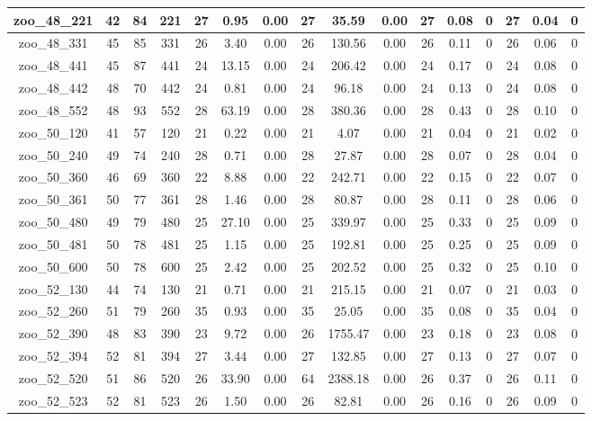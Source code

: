 \begin{landscape}
\begin{longtable}{|c|c|c|c|c|c|c|c|c|c|c|c|c|c|c|c|}
zoo\_48\_221 & 42 & 84 & 221 & 27 & 0.95 & 0.00 & 27 & 35.59 & 0.00 & 27 & 0.08 & 0 & 27 & 0.04 & 0 \\ \hline 
zoo\_48\_331 & 45 & 85 & 331 & 26 & 3.40 & 0.00 & 26 & 130.56 & 0.00 & 26 & 0.11 & 0 & 26 & 0.06 & 0 \\ \hline 
zoo\_48\_441 & 45 & 87 & 441 & 24 & 13.15 & 0.00 & 24 & 206.42 & 0.00 & 24 & 0.17 & 0 & 24 & 0.08 & 0 \\ \hline 
zoo\_48\_442 & 48 & 70 & 442 & 24 & 0.81 & 0.00 & 24 & 96.18 & 0.00 & 24 & 0.13 & 0 & 24 & 0.08 & 0 \\ \hline 
zoo\_48\_552 & 48 & 93 & 552 & 28 & 63.19 & 0.00 & 28 & 380.36 & 0.00 & 28 & 0.43 & 0 & 28 & 0.10 & 0 \\ \hline 
zoo\_50\_120 & 41 & 57 & 120 & 21 & 0.22 & 0.00 & 21 & 4.07 & 0.00 & 21 & 0.04 & 0 & 21 & 0.02 & 0 \\ \hline 
zoo\_50\_240 & 49 & 74 & 240 & 28 & 0.71 & 0.00 & 28 & 27.87 & 0.00 & 28 & 0.07 & 0 & 28 & 0.04 & 0 \\ \hline 
zoo\_50\_360 & 46 & 69 & 360 & 22 & 8.88 & 0.00 & 22 & 242.71 & 0.00 & 22 & 0.15 & 0 & 22 & 0.07 & 0 \\ \hline 
zoo\_50\_361 & 50 & 77 & 361 & 28 & 1.46 & 0.00 & 28 & 80.87 & 0.00 & 28 & 0.11 & 0 & 28 & 0.06 & 0 \\ \hline 
zoo\_50\_480 & 49 & 79 & 480 & 25 & 27.10 & 0.00 & 25 & 339.97 & 0.00 & 25 & 0.33 & 0 & 25 & 0.09 & 0 \\ \hline 
zoo\_50\_481 & 50 & 78 & 481 & 25 & 1.15 & 0.00 & 25 & 192.81 & 0.00 & 25 & 0.25 & 0 & 25 & 0.09 & 0 \\ \hline 
zoo\_50\_600 & 50 & 78 & 600 & 25 & 2.42 & 0.00 & 25 & 202.52 & 0.00 & 25 & 0.32 & 0 & 25 & 0.10 & 0 \\ \hline 
zoo\_52\_130 & 44 & 74 & 130 & 21 & 0.71 & 0.00 & 21 & 215.15 & 0.00 & 21 & 0.07 & 0 & 21 & 0.03 & 0 \\ \hline 
zoo\_52\_260 & 51 & 79 & 260 & 35 & 0.93 & 0.00 & 35 & 25.05 & 0.00 & 35 & 0.08 & 0 & 35 & 0.04 & 0 \\ \hline 
zoo\_52\_390 & 48 & 83 & 390 & 23 & 9.72 & 0.00 & 26 & 1755.47 & 0.00 & 23 & 0.18 & 0 & 23 & 0.08 & 0 \\ \hline 
zoo\_52\_394 & 52 & 81 & 394 & 27 & 3.44 & 0.00 & 27 & 132.85 & 0.00 & 27 & 0.13 & 0 & 27 & 0.07 & 0 \\ \hline 
zoo\_52\_520 & 51 & 86 & 520 & 26 & 33.90 & 0.00 & 64 & 2388.18 & 0.00 & 26 & 0.37 & 0 & 26 & 0.11 & 0 \\ \hline 
zoo\_52\_523 & 52 & 81 & 523 & 26 & 1.50 & 0.00 & 26 & 82.81 & 0.00 & 26 & 0.16 & 0 & 26 & 0.09 & 0 \\ \hline 

\end{longtable}
\end{landscape}
